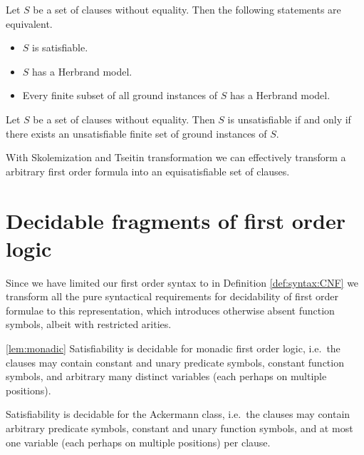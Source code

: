 \begin{theorem}[Herbrand]\label{the:herbrand}
	Let $S$ be a set of clauses without equality. Then the following statements are equivalent.
	\begin{itemize}
		\item $S$ is satisfiable.
		\item $S$ has a Herbrand model.
		\item Every finite subset of all ground instances of $S$ has a Herbrand model.
	\end{itemize} 
\end{theorem}

\begin{corollary}
	Let $S$ be a set of clauses without equality. 
	Then $S$ is unsatisfiable if and only if there exists 
	an unsatisfiable finite set of ground instances of $S$.
\end{corollary}

\begin{lemma}
With Skolemization and Tseitin transformation we can effectively transform a arbitrary first order formula into an equisatisfiable set of clauses.	
\end{lemma}



\section{Decidable fragments of first order logic}

Since we have limited our first order syntax to \CNF in Definition \vref{def:syntax:CNF} 
we transform all the pure syntactical requirements for decidability of first order formulae 
to this representation, which introduces otherwise absent function symbols, albeit with restricted arities.


\begin{lemma}\ref{lem:monadic}
	Satisfiability is decidable for monadic first order logic, 
	i.e.~the clauses 
	may contain constant and unary predicate symbols, 
	constant function symbols,
	and arbitrary many distinct variables 
	(each perhaps on multiple positions).
\end{lemma}


\begin{lemma}\label{lem:ackermann}
	Satisfiability is decidable for the Ackermann class, 
	i.e.~the clauses
	may contain arbitrary predicate symbols, 
	constant and unary function symbols, 
	and at most one variable 
	(each perhaps on multiple positions) per clause.
\end{lemma}


